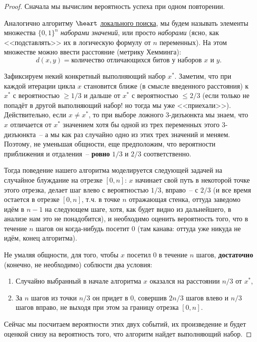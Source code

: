 \begin{proof}
Сначала мы вычислим вероятность успеха при одном повторении.

Аналогично алгоритму \hyperlink{3satlocal}{$\heart~$локального поиска}, мы будем называть элементы множества $\{0, 1\}^n$ \textit{наборами значений}, или просто \textit{наборами} (ясно, как <<подставлять>> их в логическую формулу от $n$ переменных). На этом множестве можно ввести расстояние (метрику Хемминга):
$$d(x, y) = \text{количество отличающихся битов у наборов } x \text{ и } y.$$

Зафиксируем некий конкретный выполняющий набор $x^*$.
Заметим, что при каждой итерации цикла $x$ становится ближе (в смысле введенного расстояния) к $x^*$ с вероятностью $\geq 1/3$ и дальше от $x^*$ с вероятностью $\leq 2/3$ (если только не попадёт в другой выполняющий набор! но тогда мы уже <<приехали>>). Действительно, если $x \neq x^*$, то при выборе ложного 3-дизъюнкта мы знаем, что $x$ отличается от $x^*$ значением хотя бы одной из трех переменных этого 3-дизъюнкта~-- а мы как раз случайно одно из этих трех значений и меняем.
Поэтому, не уменьшая общности, еще предположим, что вероятности приближения и отдаления~-- \textbf{ровно} $1/3$ и $2/3$ соответственно.

Тогда поведение нашего алгоритма моделируется следующей задачей на случайное блуждание на отрезке $[0, n]$: $x$ начинает свой путь в некоторой точке этого отрезка, делает шаг влево с вероятностью $1/3$, вправо~-- с $2/3$ (и все время остается в отрезке $[0, n]$, т.ч. в точке $n$ отражающая стенка, оттуда заведомо идём в $n-1$ на следующем шаге, хотя, как будет видно из дальнейшего, в анализе нам это не понадобится), и необходимо оценить вероятность того, что в течение $n$ шагов он когда-нибудь посетит 0 (там канава: оттуда уже никуда не идём, конец алгоритма).

Не умаляя общности, для того, чтобы $x$ посетил 0 в течение $n$ шагов, \textbf{достаточно} (конечно, не необходимо) соблюсти два условия:
\begin{enumerate}
    \item Случайно выбранный в начале алгоритма $x$ оказался на расстоянии $n/3$ от $x^*$,
    \item За $n$ шагов из точки $n/3$ он придет в 0, совершив $2n/3$ шагов влево и $n/3$ шагов вправо, не выходя при этом за границу отрезка $[0,n]$.
\end{enumerate}

Сейчас мы посчитаем вероятности этих двух событий, их произведение и будет оценкой снизу на вероятность того, что алгоритм найдет выполняющий набор.


\end{proof}
